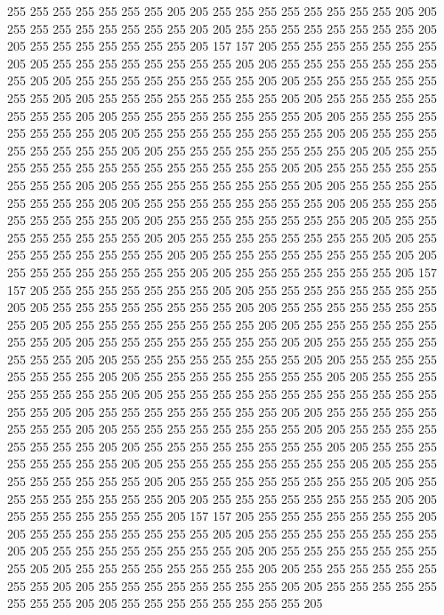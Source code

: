 255 255 255 255 255 255 255 205 205 255 255 255 255 255 255 255 255 205 205 255
255 255 255 255 255 255 255 205 205 255 255 255 255 255 255 255 255 205 205 255
255 255 255 255 255 255 205 157 157 205 255 255 255 255 255 255 255 205 205 255
255 255 255 255 255 255 255 205 205 255 255 255 255 255 255 255 255 205 205 255
255 255 255 255 255 255 255 205 205 255 255 255 255 255 255 255 255 205 205 255
255 255 255 255 255 255 255 205 205 255 255 255 255 255 255 255 255 205 205 255
255 255 255 255 255 255 255 205 205 255 255 255 255 255 255 255 255 205 205 255
255 255 255 255 255 255 255 205 205 255 255 255 255 255 255 255 255 205 205 255
255 255 255 255 255 255 255 205 205 255 255 255 255 255 255 255 255 255 255 255
255 255 255 205 205 255 255 255 255 255 255 255 255 205 205 255 255 255 255 255
255 255 255 205 205 255 255 255 255 255 255 255 255 205 205 255 255 255 255 255
255 255 255 205 205 255 255 255 255 255 255 255 255 205 205 255 255 255 255 255
255 255 255 205 205 255 255 255 255 255 255 255 255 205 205 255 255 255 255 255
255 255 255 205 205 255 255 255 255 255 255 255 255 205 205 255 255 255 255 255
255 255 255 205 205 255 255 255 255 255 255 255 255 205 205 255 255 255 255 255
255 255 205 157 157 205 255 255 255 255 255 255 255 205 205 255 255 255 255 255
255 255 255 205 205 255 255 255 255 255 255 255 255 205 205 255 255 255 255 255
255 255 255 205 205 255 255 255 255 255 255 255 255 205 205 255 255 255 255 255
255 255 255 205 205 255 255 255 255 255 255 255 255 205 205 255 255 255 255 255
255 255 255 205 205 255 255 255 255 255 255 255 255 205 205 255 255 255 255 255
255 255 255 205 205 255 255 255 255 255 255 255 255 205 205 255 255 255 255 255
255 255 255 205 205 255 255 255 255 255 255 255 255 255 255 255 255 255 255 205
205 255 255 255 255 255 255 255 255 205 205 255 255 255 255 255 255 255 255 205
205 255 255 255 255 255 255 255 255 205 205 255 255 255 255 255 255 255 255 205
205 255 255 255 255 255 255 255 255 205 205 255 255 255 255 255 255 255 255 205
205 255 255 255 255 255 255 255 255 205 205 255 255 255 255 255 255 255 255 205
205 255 255 255 255 255 255 255 255 205 205 255 255 255 255 255 255 255 255 205
205 255 255 255 255 255 255 255 255 205 205 255 255 255 255 255 255 255 205 157
157 205 255 255 255 255 255 255 255 205 205 255 255 255 255 255 255 255 255 205
205 255 255 255 255 255 255 255 255 205 205 255 255 255 255 255 255 255 255 205
205 255 255 255 255 255 255 255 255 205 205 255 255 255 255 255 255 255 255 205
205 255 255 255 255 255 255 255 255 205 205 255 255 255 255 255 255 255 255 205
205 255 255 255 255 255 255 255 255 205 205 255 255 255 255 255 255 255 255 205
